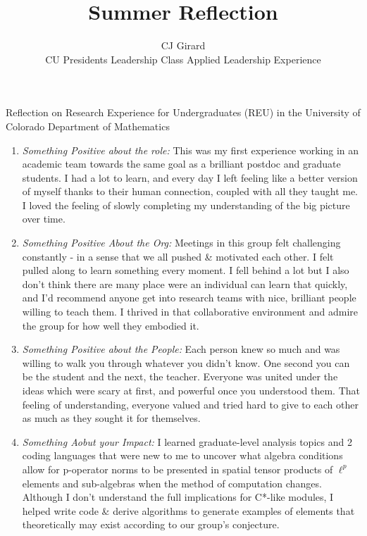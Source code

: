 \documentclass[12pt]{article}
\begin{document}
 
 
\title{Summer Reflection}
\author{CJ Girard\\ %
CU Presidents Leadership Class Applied Leadership Experience}

\maketitle

\noindent Reflection on Research Experience for Undergraduates (REU) in the University of Colorado Department of Mathematics

\begin{enumerate} 
\item \textit{Something Positive about the role:} This was my first experience working in an academic team towards the same goal as a brilliant postdoc and graduate students. I had a lot to learn, and every day I left feeling like a better version of myself thanks to their human connection, coupled with all they taught me. I loved the feeling of slowly completing my understanding of the big picture over time.
\item \textit{Something Positive About the Org: }Meetings in this group felt challenging constantly - in a sense that we all pushed & motivated each other. I felt pulled along to learn something every moment. I fell behind a lot but I also don't think there are many place were an individual can learn that quickly, and I'd recommend anyone get into research teams with nice, brilliant people willing to teach them. I thrived in that collaborative environment and admire the group for how well they embodied it.
\item \textit{Something Positive about the People: }Each person knew so much and was willing to walk you through whatever you didn't know. One second you can be the student and the next, the teacher. Everyone was united under the ideas which were scary at first, and powerful once you understood them. That feeling of understanding, everyone valued and tried hard to give to each other as much as they sought it for themselves.
\item \textit{Something Aobut your Impact: }I learned graduate-level analysis topics and 2 coding languages that were new to me to uncover what algebra conditions allow for p-operator norms to be presented in spatial tensor products of $\ell^p$ elements and sub-algebras when the method of computation changes. Although I don't understand the full implications for C*-like modules, I helped write code & derive algorithms to generate examples of elements that theoretically may exist according to our group's conjecture.

\end{enumerate}
\end{document}

